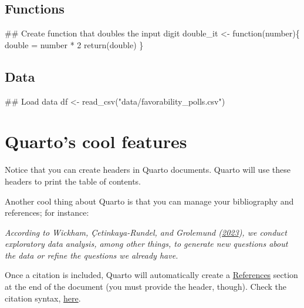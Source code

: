 \documentclass[
  12pt,
  letterpaper,
  DIV=11,
  numbers=noendperiod]{scrartcl}
\newenvironment{Shaded}{}{}
\newcommand{\ControlFlowTok}[1]{\textcolor[rgb]{0.65,0.15,0.64}{#1}}
\newcommand{\DecValTok}[1]{\textcolor[rgb]{0.60,0.41,0.00}{#1}}
\newcommand{\DocumentationTok}[1]{\textcolor[rgb]{0.89,0.34,0.29}{#1}}
\newcommand{\FunctionTok}[1]{\textcolor[rgb]{0.25,0.47,0.95}{#1}}
\newcommand{\NormalTok}[1]{\textcolor[rgb]{0.22,0.23,0.26}{#1}}
\newcommand{\OtherTok}[1]{\textcolor[rgb]{0.15,0.68,0.38}{#1}}
\newcommand{\SpecialCharTok}[1]{\textcolor[rgb]{0.00,0.52,0.74}{#1}}
\newcommand{\StringTok}[1]{\textcolor[rgb]{0.31,0.63,0.31}{#1}}
\begin{document}
\hypertarget{functions}{%
\subsection{Functions}\label{functions}}

\begin{Shaded}
\begin{Highlighting}[]
\DocumentationTok{\#\# Create function that doubles the input digit}
\NormalTok{double\_it }\OtherTok{\textless{}{-}} \ControlFlowTok{function}\NormalTok{(number)\{}
\NormalTok{  double }\OtherTok{=}\NormalTok{ number }\SpecialCharTok{*} \DecValTok{2}
  \FunctionTok{return}\NormalTok{(double)}
\NormalTok{\}}
\end{Highlighting}
\end{Shaded}

\hypertarget{data}{%
\subsection{Data}\label{data}}

\begin{Shaded}
\begin{Highlighting}[]
\DocumentationTok{\#\# Load data}
\NormalTok{df }\OtherTok{\textless{}{-}} \FunctionTok{read\_csv}\NormalTok{(}\StringTok{"data/favorability\_polls.csv"}\NormalTok{)}
\end{Highlighting}
\end{Shaded}

\hypertarget{quartos-cool-features}{%
\section{Quarto's cool features}\label{quartos-cool-features}}

Notice that you can create headers in Quarto documents. Quarto will use
these headers to print the table of contents.

Another cool thing about Quarto is that you can manage your bibliography
and references; for instance:

\emph{According to Wickham, Çetinkaya-Rundel, and Grolemund
(\protect\hyperlink{ref-wickham2023r}{2023}), we conduct exploratory
data analysis, among other things, to generate new questions about the
data or refine the questions we already have.}

Once a citation is included, Quarto will automatically create a
\protect\hyperlink{references}{References} section at the end of the
document (you must provide the header, though). Check the citation
syntax, \href{https://quarto.org/docs/authoring/citations.html}{here}.
\end{document}
